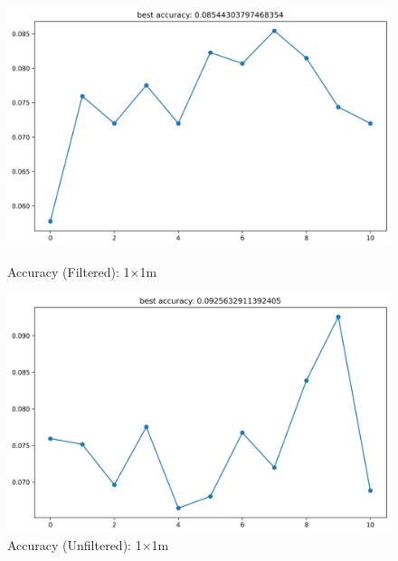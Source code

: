 \documentclass[runningheads]{llncs}
\begin{document}
\begin{figure}[H]
	\centering
	\begin{minipage}{0.49\textwidth}
		\centering
		\includegraphics[width=\textwidth]{figures/filtered/mlp_acc_1.png}
		\caption*{Accuracy (Filtered): 1×1m}
	\end{minipage}
	\hfill
	\begin{minipage}{0.49\textwidth}
		\centering
		\includegraphics[width=\textwidth]{figures/unfiltered/mlp_acc_1.png}
		\caption*{Accuracy (Unfiltered): 1×1m}
	\end{minipage}
\end{figure}
\end{document}
